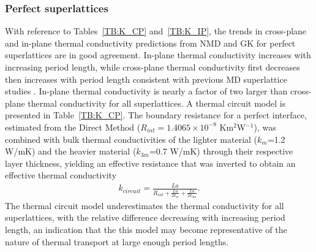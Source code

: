 \subsubsection{Perfect superlattices}
With reference to Tables~\ref{TB:K_CP} and~\ref{TB:K_IP}, the trends in cross-plane and in-plane thermal conductivity predictions from NMD and GK for perfect superlattices are in good agreement. In-plane thermal conductivity increases with increasing period length, while cross-plane thermal conductivity first decreases then increases with period length consistent with previous MD superlattice studies \cite {PhysRevB.72.174302}. In-plane thermal conductivity is nearly a factor of two larger than cross-plane thermal conductivity for all superlattices. A thermal circuit model is presented in Table~\ref{TB:K_CP}. The boundary resistance for a perfect interface, estimated from the Direct Method ($R_{int}=1.4065\times10^{-8}$ Km$^2$W$^{-1}$), was combined with bulk thermal conductivities of the lighter material ($k_{m}$=1.2 W/mK) and the heavier material ($k_{3m}$=0.7 W/mK) through their respective layer thickness, yielding an effective resistance that was inverted to obtain an effective thermal conductivity 
\begin{equation}\label{EQ:TCircuit}
\begin{split}
k_{circuit}= \frac{La}{R_{int}+\frac{La}{2k_m}+\frac{La}{2k_{3m}}}.
\end{split}
\end{equation}
The thermal circuit model underestimates the thermal conductivity for all superlattices, with the relative difference decreasing with increasing period length, an indication that the this model may become representative of the nature of thermal transport at large enough period lengths.
